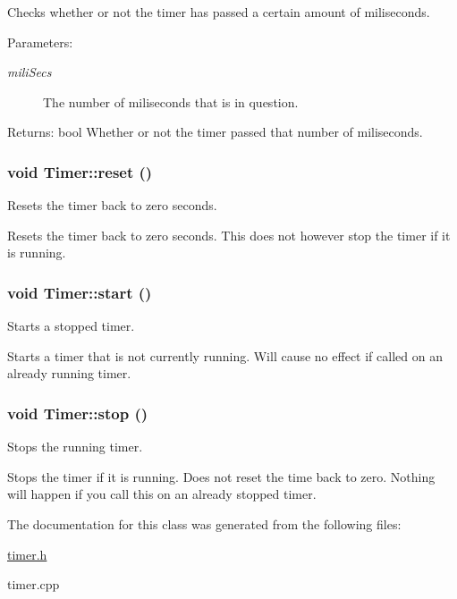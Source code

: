 Checks whether or not the timer has passed a certain amount of miliseconds. 

\begin{Desc}
\item[Parameters:]
\begin{description}
\item[{\em miliSecs}]The number of miliseconds that is in question. \end{description}
\end{Desc}
\begin{Desc}
\item[Returns:]bool Whether or not the timer passed that number of miliseconds. \end{Desc}
\hypertarget{class_timer_9020542d73357a4eef512eefaf57524b}{
\subsubsection[{reset}]{\setlength{\rightskip}{0pt plus 5cm}void Timer::reset ()}}
\label{class_timer_9020542d73357a4eef512eefaf57524b}


Resets the timer back to zero seconds. 

Resets the timer back to zero seconds. This does not however stop the timer if it is running. \hypertarget{class_timer_3a8b5272198d029779dc9302a54305a8}{
\subsubsection[{start}]{\setlength{\rightskip}{0pt plus 5cm}void Timer::start ()}}
\label{class_timer_3a8b5272198d029779dc9302a54305a8}


Starts a stopped timer. 

Starts a timer that is not currently running. Will cause no effect if called on an already running timer. \hypertarget{class_timer_63f0eb44b27402196590a03781515dba}{
\subsubsection[{stop}]{\setlength{\rightskip}{0pt plus 5cm}void Timer::stop ()}}
\label{class_timer_63f0eb44b27402196590a03781515dba}


Stops the running timer. 

Stops the timer if it is running. Does not reset the time back to zero. Nothing will happen if you call this on an already stopped timer. 

The documentation for this class was generated from the following files:\begin{CompactItemize}
\item 
\hyperlink{timer_8h}{timer.h}\item 
timer.cpp\end{CompactItemize}
